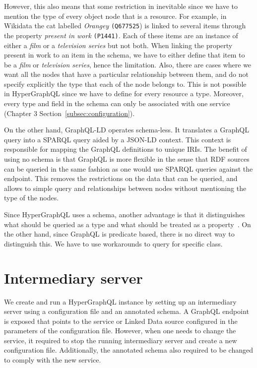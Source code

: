 However, this also means that some restriction in inevitable since we have to mention the type of every object node that is a resource. For example, in Wikidata the cat labelled \textit{Orangey} \texttt{(Q677525}) is linked to several items through the property \textit{present in work} \texttt{(P1441)}. Each of these items are an instance of either a \textit{film} or a \textit{television series} but not both. When linking the property present in work to an item in the schema, we have to either define that item to be a \textit{film} or \textit{television series}, hence the limitation. Also, there are cases where we want all the nodes that have a particular relationship between them, and do not specify explicitly the type that each of the node belongs to. This is not possible in HyperGraphQL since we have to define for every resource a type. Moreover, every type and field in the schema can only be associated with one service (Chapter 3 Section~\ref{subsec:configuration}). 

On the other hand, GraphQL-LD operates schema-less. It translates a GraphQL query into a SPARQL query aided by a JSON-LD context. This context is responsible for mapping the GraphQL definitions to unique IRIs. The benefit of using no schema is that GraphQL is more flexible in the sense that RDF sources can be queried in the same fashion as one would use SPARQL queries against the endpoint. This removes the restrictions on the data that can be queried, and allows to simple query and relationships between nodes without mentioning the type of the nodes.

Since HyperGraphQL uses a schema, another advantage is that it distinguishes what should be queried as a type and what should be treated as a property~\cite{Werbrouck2019a}. On the other hand, since GraphQL is predicate based, there is no direct way to distinguish this. We have to use workarounds to query for specific class.


\section{Intermediary server}
We create and run a HyperGraphQL instance by setting up an intermediary server using a configuration file and an annotated schema. A GraphQL endpoint is exposed that points to the service or Linked Data source configured in the parameters of the configuration file. However, when one needs to change the service, it required to stop the running intermediary server and create a new configuration file. Additionally, the annotated schema also required to be changed to comply with the new service. 

